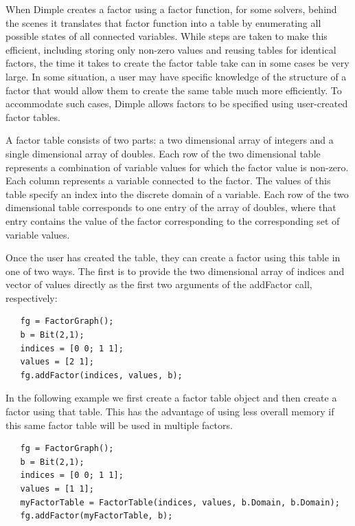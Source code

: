 \fi


When Dimple creates a factor using a factor function, for some solvers, behind the scenes it translates that factor function into a table by enumerating all possible states of all connected variables.  While steps are taken to make this efficient, including storing only non-zero values and reusing tables for identical factors, the time it takes to create the factor table take can in some cases be very large.  In some situation, a user may have specific knowledge of the structure of a factor that would allow them to create the same table much more efficiently.  To accommodate such cases, Dimple allows factors to be specified using user-created factor tables.

A factor table consists of two parts: a two dimensional array of integers and a single dimensional array of doubles.  Each row of the two dimensional table represents a combination of variable values for which the factor value is non-zero.  Each column represents a variable connected to the factor. The values of this table specify an index into the discrete domain of a variable. Each row of the two dimensional table corresponds to one entry of the array of doubles, where that entry contains the value of the factor corresponding to the corresponding set of variable values.

Once the user has created the table, they can create a factor using this table in one of two ways. The first is to provide the two dimensional array of indices and vector of values directly as the first two arguments of the addFactor call, respectively:

\ifmatlab

\begin{lstlisting}
   fg = FactorGraph();
   b = Bit(2,1);
   indices = [0 0; 1 1];
   values = [2 1];
   fg.addFactor(indices, values, b);
\end{lstlisting}
   
In the following example we first create a factor table object and then create a factor using that table. This has the advantage of using less overall memory if this same factor table will be used in multiple factors.

\begin{lstlisting}
   fg = FactorGraph();
   b = Bit(2,1);   
   indices = [0 0; 1 1];
   values = [1 1];
   myFactorTable = FactorTable(indices, values, b.Domain, b.Domain);	
   fg.addFactor(myFactorTable, b);
\end{lstlisting}
   
